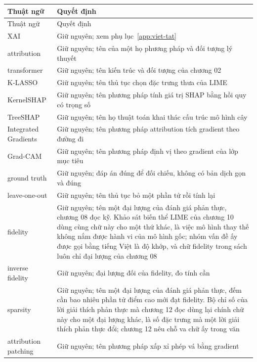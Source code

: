 \footnotesize
\begin{longtable}{@{}lp{7cm}@{}}
\toprule
Thuật ngữ & Quyết định \\
\midrule
\endfirsthead
\toprule
Thuật ngữ & Quyết định \\
\midrule
\endhead
XAI & Giữ nguyên; xem phụ lục~\ref{app:viet-tat} \\
attribution & Giữ nguyên; tên của một họ phương pháp và đối tượng lý thuyết \\
transformer & Giữ nguyên; tên kiến trúc và đối tượng của chương 02 \\
K-LASSO & Giữ nguyên; tên thủ tục chọn đặc trưng thưa của LIME \\
KernelSHAP & Giữ nguyên; tên phương pháp tính giá trị SHAP bằng hồi quy có trọng số \\
TreeSHAP & Giữ nguyên; tên họ thuật toán khai thác cấu trúc mô hình cây \\
Integrated Gradients & Giữ nguyên; tên phương pháp attribution tích gradient theo đường đi \\
Grad-CAM & Giữ nguyên; tên phương pháp định vị theo gradient của lớp mục tiêu \\
ground truth & Giữ nguyên; đáp án đúng để đối chiếu, không có bản dịch gọn và đúng \\
leave-one-out & Giữ nguyên; tên thủ tục bỏ một phần tử rồi tính lại \\
fidelity & Giữ nguyên; tên một đại lượng của đánh giá phản thực, chương 08 đọc kỹ. Khảo sát biến thể LIME của chương 10 dùng cùng chữ này cho một thứ khác, là việc mô hình thay thế không nắm được hành vi của mô hình gốc; nhóm vấn đề ấy được gọi bằng tiếng Việt là độ khớp, và chữ fidelity trong sách luôn chỉ đại lượng của chương 08 \\
inverse fidelity & Giữ nguyên; đại lượng đối của fidelity, đo tính cần \\
sparsity & Giữ nguyên; tên một đại lượng của đánh giá phản thực, đếm cần bao nhiêu phần tử điểm cao mới đạt fidelity. Bộ chỉ số của lời giải thích phản thực mà chương 12 đọc dùng lại chính chữ này cho một đại lượng khác, là số đặc trưng mà một lời giải thích phản thực đổi; chương 12 nêu chỗ va chữ ấy trong văn \\
attribution patching & Giữ nguyên; tên phương pháp xấp xỉ phép vá bằng gradient \\

\end{longtable}
